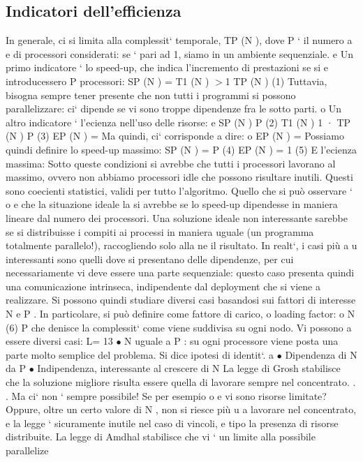 \documentclass[a4paper,12pt]{article}
\begin{document}
\subsection{Indicatori dell'efficienza}
In generale, ci si limita alla complessit` temporale, TP (N ), dove P ` il numero
a
e
di processori considerati: se ` pari ad 1, siamo in un ambiente sequenziale.
e
Un primo indicatore ` lo speed-up, che indica l'incremento di prestazioni se si
e
introducessero P processori:
SP (N ) =
T1 (N )
$>$1
TP (N )
(1)
Tuttavia, bisogna sempre tener presente che non tutti i programmi si possono
parallelizzare: ci` dipende se vi sono troppe dipendenze fra le sotto parti.
o
Un altro indicatore ` l'ecienza nell'uso delle risorse:
e
SP (N )
P
(2)
T1 (N ) 1
·
TP (N ) P
(3)
EP (N ) =
Ma quindi, ci` corrisponde a dire:
o
EP (N ) =
Possiamo quindi definire lo speed-up massimo:
SP (N ) = P
(4)
EP (N ) = 1
(5)
E l'ecienza massima:
Sotto queste condizioni si avrebbe che tutti i processori lavorano al massimo,
ovvero non abbiamo processori idle che possono risultare inutili. Questi sono
coecienti statistici, validi per tutto l'algoritmo. Quello che si può osservare `
o
e
che la situazione ideale la si avrebbe se lo speed-up dipendesse in maniera lineare dal numero dei processori. Una
soluzione ideale non interessante sarebbe
se si distribuisse i compiti ai processi in maniera uguale (un programma totalmente parallelo!), raccogliendo solo alla
ne il risultato. In realt`, i casi più
a
u
interessanti sono quelli dove si presentano delle dipendenze, per cui necessariamente vi deve essere una parte
sequenziale: questo caso presenta quindi una
comunicazione intrinseca, indipendente dal deployment che si viene a realizzare.
Si possono quindi studiare diversi casi basandosi sui fattori di interesse N e
P . In particolare, si può definire come fattore di carico, o loading factor:
o
N
(6)
P
che denisce la complessit` come viene suddivisa su ogni nodo. Vi possono
a
essere diversi casi:
L=
13
$\bullet$ N uguale a P : su ogni processore viene posta una parte molto semplice
del problema. Si dice ipotesi di identit`.
a
$\bullet$ Dipendenza di N da P
$\bullet$ Indipendenza, interessante al crescere di N
La legge di Grosh stabilisce che la soluzione migliore risulta essere quella di lavorare sempre nel concentrato. . . Ma
ci` non ` sempre possibile! Se per esempio
o
e
vi sono risorse limitate? Oppure, oltre un certo valore di N , non si riesce più
u
a lavorare nel concentrato, e la legge ` sicuramente inutile nel caso di vincoli,
e
tipo la presenza di risorse distribuite.
La legge di Amdhal stabilisce che vi ` un limite alla possibile parallelize
\end{document}

